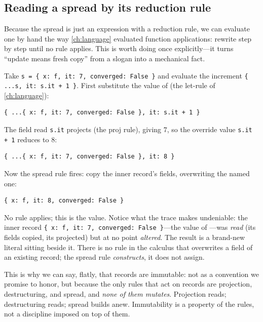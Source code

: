 \subsection{Reading a spread by its reduction rule}

Because the spread is just an expression with a reduction rule, we can evaluate
one by hand the way \cref{ch:language} evaluated function applications: rewrite
step by step until no rule applies. This is worth doing once explicitly---it
turns ``update means fresh copy'' from a slogan into a mechanical fact.

\begin{example}
\label{ex:reduce}
Take \lstinline[style=l4style]|s = { x: f, it: 7, converged: False }| and evaluate
the increment \lstinline[style=l4style]|{ ...s, it: s.it + 1 }|. First substitute
the value of  (the \textsf{let}-rule of \cref{ch:language}):
\begin{lstlisting}[style=l4style]
{ ...{ x: f, it: 7, converged: False }, it: s.it + 1 }
\end{lstlisting}
The field read \lstinline[style=l4style]|s.it| projects (the \textsf{proj} rule),
giving $7$, so the override value \lstinline[style=l4style]|s.it + 1| reduces to
$8$:
\begin{lstlisting}[style=l4style]
{ ...{ x: f, it: 7, converged: False }, it: 8 }
\end{lstlisting}
Now the spread rule fires: copy the inner record's fields, overwriting the named
one:
\begin{lstlisting}[style=l4style]
{ x: f, it: 8, converged: False }
\end{lstlisting}
No rule applies; this is the value. Notice what the trace makes undeniable: the
inner record \lstinline[style=l4style]|{ x: f, it: 7, converged: False }|---the
value of ---was \emph{read} (its fields copied, its  projected)
but at no point \emph{altered}. The result is a brand-new literal sitting beside
it. There is no rule in the calculus that overwrites a field of an existing
record; the spread rule \emph{constructs}, it does not assign.
\end{example}

This is why we can say, flatly, that records are immutable: not as a convention we
promise to honor, but because the only rules that act on records are projection,
destructuring, and spread, and \emph{none of them mutates}. Projection reads;
destructuring reads; spread builds anew. Immutability is a property of the
rules, not a discipline imposed on top of them.

